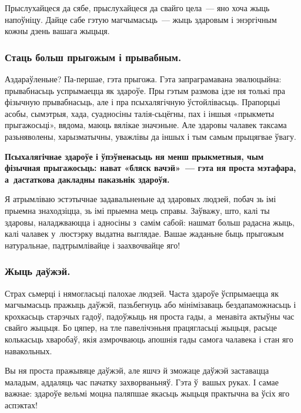 Прыслухайцеся да сябе, прыслухайцеся да свайго цела~--- яно хоча жыць напоўніцу. Дайце сабе гэтую магчымасьць~--- жыць здаровым і энэргічным кожны дзень вашага жыцьця.

\subsubsection{Стаць больш прыгожым і прывабным.}

Аздараўленьне? Па-першае, гэта прыгожа. Гэта запраграмавана эвалюцыйна: прывабнасьць успрымаецца як здароўе. Пры гэтым размова ідзе ня толькі пра фізычную прывабнасьць, але і пра псыхалягічную ўстойлівасьць. Прапорцыі асобы, сымэтрыя, хада, суадносіны талія-сьцёгны, пах і іншыя «прыкметы прыгажосьці», вядома, маюць вялікае значэньне. Але здаровы чалавек таксама разьняволены, харызматычны, уважлівы да іншых і тым самым прыцягвае ўвагу.

\textbf{Псыхалягічнае здароўе і ўпэўненасьць ня менш прыкметныя, чым фізычная прыгажосьць: нават «бляск вачэй»~--- гэта ня проста мэтафара, а~дастаткова дакладны паказьнік здароўя.}

Я атрымліваю эстэтычнае задавальненьне ад здаровых людзей, побач зь імі прыемна знаходзіцца, зь імі прыемна мець справы. Заўважу, што, калі ты здаровы, наладжваюцца і адносіны з~самім сабой: нашмат больш радасна жыць, калі чалавек у~люстэрку выдатна выглядае. Вашае жаданьне быць прыгожым натуральнае, падтрымлівайце і заахвочвайце яго!

\subsubsection{Жыць даўжэй.}

Страх сьмерці і нямогласьці палохае людзей. Часта здароўе ўспрымаецца як магчымасьць пражыць даўжэй, пазьбегнуць або мінімізаваць бездапаможнасьць і крохкасьць старэчых гадоў, падоўжыць ня проста гады, а~менавіта актыўны час свайго жыцьця. Бо цяпер, на тле павелічэньня працягласьці жыцьця, расьце колькасьць хваробаў, якія азмрочваюць апошнія гады самога чалавека і стан яго навакольных.


Вы ня проста пражывяце даўжэй, але яшчэ й зможаце даўжэй заставацца маладым, аддаляць час пачатку захворваньняў. Гэта ў~вашых руках. І самае важнае: здароўе вельмі моцна паляпшае якасьць жыцьця практычна ва ўсіх яго аспэктах!

